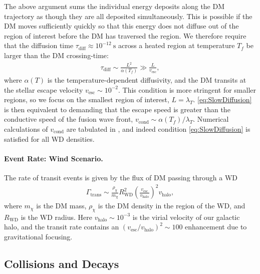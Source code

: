 \documentclass[preprintnumbers,amsmath,amssymb,prd,superscriptaddress]{revtex4}
\def\r{\right)}
\def\l{\left(}
\begin{document}
The above argument sums the individual energy deposits along the DM trajectory as though they are all deposited simultaneously.
This is possible if the DM moves sufficiently quickly so that this energy does not diffuse out of the region of interest before the DM has traversed the region.
We therefore require that the diffusion time $\tau_\text{diff} \approx 10^{-12} ~\text{s}$ across a heated region at temperature $T_f$ be larger than the DM crossing-time:
\begin{align}
  \tau_\text{diff} \sim \frac{L^2}{\alpha(T_f)} \gg
  \frac{L}{v_\text{esc}},
\label{eq:SlowDiffusion}
\end{align}
where $\alpha(T)$ is the temperature-dependent diffusivity, and the DM transits at the stellar escape velocity $v_\text{esc} \sim 10^{-2}$.
This condition is more stringent for smaller regions, so we focus on the smallest region of interest, $L = \lambda_T$.
\eqref{eq:SlowDiffusion} is then equivalent to demanding that the escape speed is greater than the conductive speed of the fusion wave front, $v_\text{cond} \sim \alpha(T_f) / \lambda_T$.
Numerical calculations of $v_\text{cond}$ are tabulated in \cite{Woosley}, and indeed condition \eqref{eq:SlowDiffusion} is satisfied for all WD densities.

\paragraph{Event Rate: Wind Scenario.}
The rate of transit events is given by the flux of DM passing through a WD
\begin{align}
  \Gamma_\text{trans} \sim
  \frac{\rho_{\chi}}{m_\chi} R_\text{WD}^2
  \l\frac{v_\text{esc}}{v_\text{halo}}\r^2 v_\text{halo},
\label{eq:TransitFluxCondition}
\end{align}
where $m_\chi$ is the DM mass, $\rho_\chi$ is the DM density in the region of the WD, and $R_\text{WD}$ is the WD radius.
Here $v_\text{halo} \sim 10^{-3}$ is the virial velocity of our galactic halo, and the transit rate contains an $(v_\text{esc}/v_\text{halo})^2 \sim 100$ enhancement due to gravitational focusing.

\subsection{Collisions and Decays}
\end{document}
